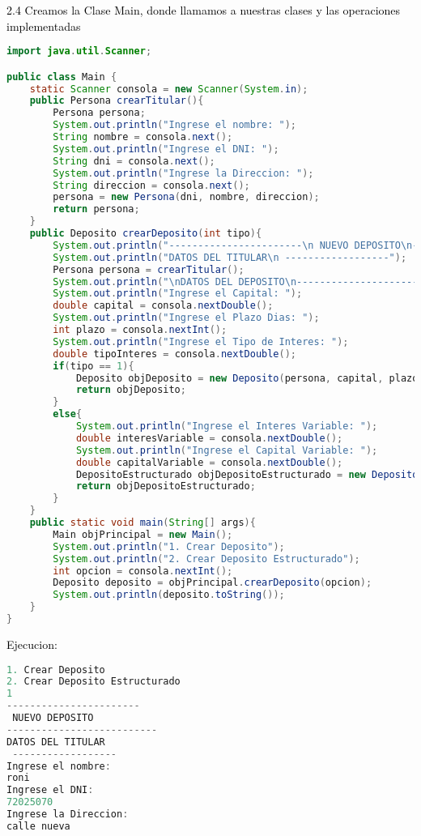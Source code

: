 \documentclass{article}
\begin{document}
\begin{itemize}
\begin{itemize}
\begin{lstlisting}[language=java]
        \end{lstlisting}
        \textcolor{black}{2.4 Creamos la Clase Main, donde llamamos a nuestras clases y las operaciones implementadas}
        \begin{lstlisting}[language=java]
import java.util.Scanner;

public class Main {
    static Scanner consola = new Scanner(System.in);
    public Persona crearTitular(){
        Persona persona;
        System.out.println("Ingrese el nombre: ");
        String nombre = consola.next();
        System.out.println("Ingrese el DNI: ");
        String dni = consola.next();
        System.out.println("Ingrese la Direccion: ");
        String direccion = consola.next();
        persona = new Persona(dni, nombre, direccion);
        return persona;
    }
    public Deposito crearDeposito(int tipo){
        System.out.println("-----------------------\n NUEVO DEPOSITO\n--------------------------");
        System.out.println("DATOS DEL TITULAR\n ------------------");
        Persona persona = crearTitular();
        System.out.println("\nDATOS DEL DEPOSITO\n---------------------");
        System.out.println("Ingrese el Capital: ");
        double capital = consola.nextDouble();
        System.out.println("Ingrese el Plazo Dias: ");
        int plazo = consola.nextInt();
        System.out.println("Ingrese el Tipo de Interes: ");
        double tipoInteres = consola.nextDouble();
        if(tipo == 1){
            Deposito objDeposito = new Deposito(persona, capital, plazo, tipoInteres);
            return objDeposito;
        }
        else{
            System.out.println("Ingrese el Interes Variable: ");
            double interesVariable = consola.nextDouble();
            System.out.println("Ingrese el Capital Variable: ");
            double capitalVariable = consola.nextDouble();
            DepositoEstructurado objDepositoEstructurado = new DepositoEstructurado(interesVariable, capitalVariable, persona, capital, plazo, tipoInteres);
            return objDepositoEstructurado;
        }
    }
    public static void main(String[] args){
        Main objPrincipal = new Main();
        System.out.println("1. Crear Deposito");
        System.out.println("2. Crear Deposito Estructurado");
        int opcion = consola.nextInt();
        Deposito deposito = objPrincipal.crearDeposito(opcion);
        System.out.println(deposito.toString());
    }
}

        \end{lstlisting}
        \textcolor{black}{Ejecucion:}
        \begin{lstlisting}[language=java]
1. Crear Deposito
2. Crear Deposito Estructurado
1
-----------------------
 NUEVO DEPOSITO
--------------------------
DATOS DEL TITULAR
 ------------------
Ingrese el nombre:
roni
Ingrese el DNI:
72025070
Ingrese la Direccion:
calle nueva


\end{lstlisting}
\end{itemize}
\end{itemize}
\end{document}
